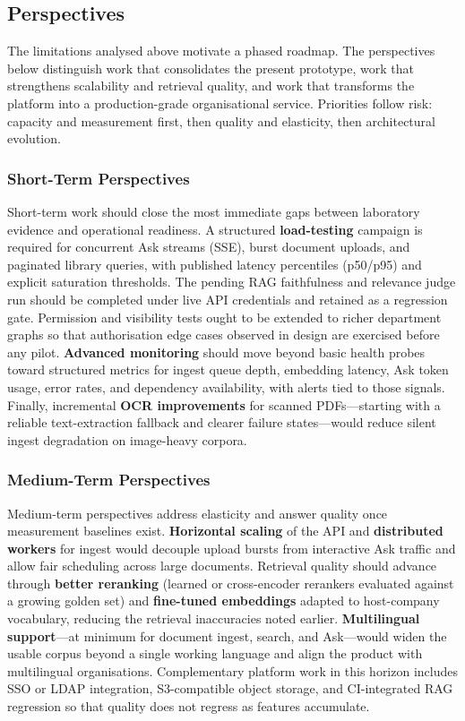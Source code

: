 \subsection{Perspectives}

The limitations analysed above motivate a phased roadmap. The perspectives below
distinguish work that consolidates the present prototype, work that strengthens
scalability and retrieval quality, and work that transforms the platform into a
production-grade organisational service. Priorities follow risk: capacity and
measurement first, then quality and elasticity, then architectural evolution.

\subsubsection{Short-Term Perspectives}

Short-term work should close the most immediate gaps between laboratory evidence
and operational readiness. A structured \textbf{load-testing} campaign is required
for concurrent Ask streams (SSE), burst document uploads, and paginated library
queries, with published latency percentiles (p50/p95) and explicit saturation
thresholds. The pending RAG faithfulness and relevance judge run should be
completed under live API credentials and retained as a regression gate. Permission
and visibility tests ought to be extended to richer department graphs so that
authorisation edge cases observed in design are exercised before any pilot.
\textbf{Advanced monitoring} should move beyond basic health probes toward
structured metrics for ingest queue depth, embedding latency, Ask token usage,
error rates, and dependency availability, with alerts tied to those signals.
Finally, incremental \textbf{OCR improvements} for scanned PDFs---starting with a
reliable text-extraction fallback and clearer failure states---would reduce
silent ingest degradation on image-heavy corpora.

\subsubsection{Medium-Term Perspectives}

Medium-term perspectives address elasticity and answer quality once measurement
baselines exist. \textbf{Horizontal scaling} of the API and \textbf{distributed
workers} for ingest would decouple upload bursts from interactive Ask traffic and
allow fair scheduling across large documents. Retrieval quality should advance
through \textbf{better reranking} (learned or cross-encoder rerankers evaluated
against a growing golden set) and \textbf{fine-tuned embeddings} adapted to
host-company vocabulary, reducing the retrieval inaccuracies noted earlier.
\textbf{Multilingual support}---at minimum for document ingest, search, and
Ask---would widen the usable corpus beyond a single working language and align
the product with multilingual organisations. Complementary platform work in this
horizon includes SSO or LDAP integration, S3-compatible object storage, and
CI-integrated RAG regression so that quality does not regress as features
accumulate.

